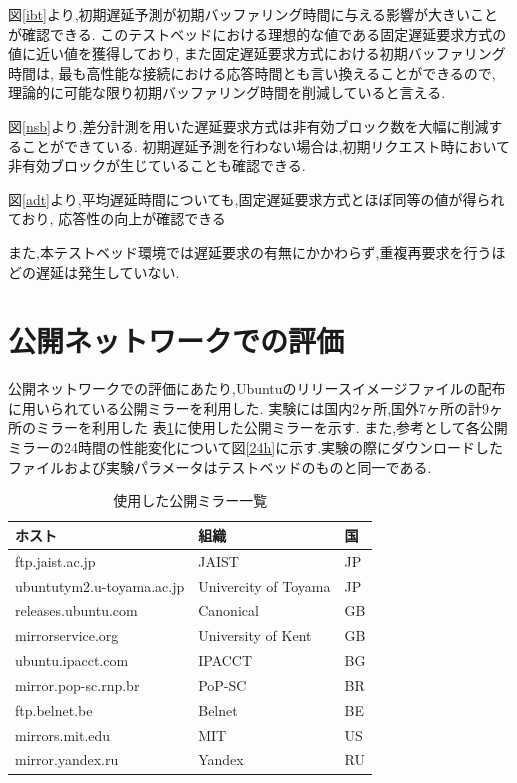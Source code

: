 \documentclass[a4j,12pt]{gradthesis_utf8}
\begin{document}
\clearpage

図\ref{ibt}より,初期遅延予測が初期バッファリング時間に与える影響が大きいことが確認できる.
このテストベッドにおける理想的な値である固定遅延要求方式の値に近い値を獲得しており,
また固定遅延要求方式における初期バッファリング時間は,
最も高性能な接続における応答時間とも言い換えることができるので,
理論的に可能な限り初期バッファリング時間を削減していると言える.

図\ref{nsb}より,差分計測を用いた遅延要求方式は非有効ブロック数を大幅に削減することができている.
初期遅延予測を行わない場合は,初期リクエスト時において非有効ブロックが生じていることも確認できる.

図\ref{adt}より,平均遅延時間についても,固定遅延要求方式とほぼ同等の値が得られており,
応答性の向上が確認できる

また,本テストベッド環境では遅延要求の有無にかかわらず,重複再要求を行うほどの遅延は発生していない.
\clearpage

\section{公開ネットワークでの評価}
\label{pub}
公開ネットワークでの評価にあたり,Ubuntuのリリースイメージファイルの配布に用いられている公開ミラー\cite{ubuntu}を利用した.
実験には国内2ヶ所,国外7ヶ所の計9ヶ所のミラーを利用した
表\ref{tablemirror}に使用した公開ミラーを示す.
また,参考として各公開ミラーの24時間の性能変化について図\ref{24h}に示す.実験の際にダウンロードしたファイルおよび実験パラメータはテストベッドのものと同一である.
\begin{table}[h]
	\begin{center}
		\caption{使用した公開ミラー一覧}
		\label{tablemirror}
		\begin{tabular}{|l|l|l|} \hline
			ホスト & 組織 & 国\\ \hline \hline
			ftp.jaist.ac.jp & JAIST & JP \\
			ubuntutym2.u-toyama.ac.jp & Univercity of Toyama & JP \\
			releases.ubuntu.com & Canonical & GB \\
			mirrorservice.org & University of Kent & GB \\
			ubuntu.ipacct.com & IPACCT & BG \\
			mirror.pop-sc.rnp.br & PoP-SC & BR \\
			ftp.belnet.be & Belnet & BE \\
			mirrors.mit.edu & MIT & US \\
			mirror.yandex.ru & Yandex & RU \\ \hline
		\end{tabular}
	\end{center}
\end{table}
\end{document}

